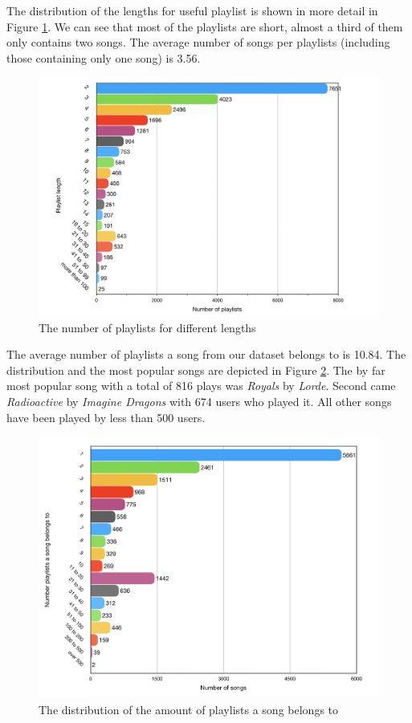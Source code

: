 The distribution of the lengths for useful playlist is shown in more detail in Figure \ref{fig:playlist_length_distribution}. We can see that most of the playlists are short, almost a third of them only contains two songs. The average number of songs per playlists (including those containing only one song) is 3.56. 
\begin{figure}[ht]
    \centering
	\includegraphics[width=1\linewidth]{./img/playlist_length_numbers.png}
	\caption{The number of playlists for different lengths}
	\label{fig:playlist_length_distribution}
\end{figure}

The average number of playlists a song from our dataset belongs to is 10.84. The distribution and the most popular songs are depicted in Figure \ref{fig:popular_song_distribution}. The by far most popular song with a total of 816 plays was \textit{Royals} by \textit{Lorde}. Second came \textit{Radioactive} by \textit{Imagine Dragons} with 674 users who played it. All other songs have been played by less than 500 users.

\begin{figure}[ht]
    \centering
	\includegraphics[width=0.8\linewidth]{./img/times_played_numbers2.png}
	\caption{The distribution of the amount of playlists a song belongs to}
	\label{fig:popular_song_distribution}
\end{figure}
